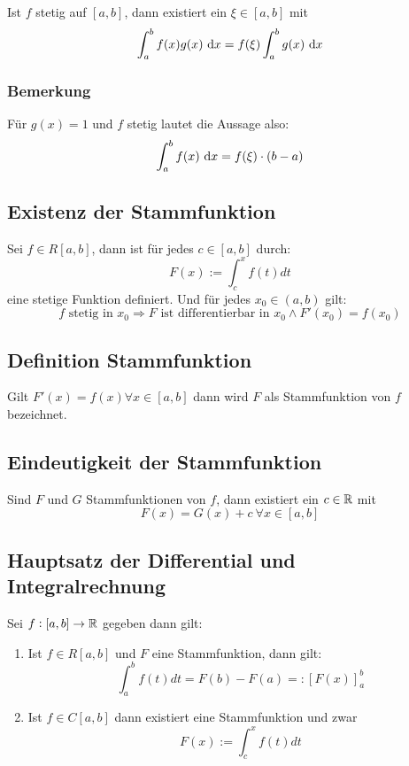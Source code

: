 Ist $f$ stetig auf $[a, b]$, dann existiert ein $\xi \in [a, b]$ mit
\begin{equation*}
    \int_a^b f(x)g(x)\text{ d}x = f(\xi) \int_a^b g(x) \text{ d}x
\end{equation*}

\subsubsection{Bemerkung}
Für $g(x)=1$ und $f$ stetig lautet die Aussage also:
\begin{equation*}
    \int_a^b f(x) \text{ d}x = f(\xi) \cdot (b - a)
\end{equation*}

\subsection{Existenz der Stammfunktion}
Sei $f \in R[a, b]$, dann ist für jedes $c \in [a, b]$ durch:
\begin{equation*}
    F(x) := \int_c^x f(t) dt
\end{equation*}
eine stetige Funktion definiert. Und für jedes $x_0 \in (a,b)$ gilt:
\begin{equation*}
    f \text{ stetig in } x_0 \Rightarrow F \text{ ist differentierbar in } x_0
    \land F'(x_0)=f(x_0)
\end{equation*}

\subsection{Definition Stammfunktion}
Gilt $F'(x) = f(x) \forall x \in [a,b]$ dann wird $F$ als Stammfunktion von
$f$ bezeichnet.

\subsection{Eindeutigkeit der Stammfunktion}
Sind $F$ und $G$ Stammfunktionen von $f$, dann existiert ein $c \in \mathbb{R}$ mit
\begin{equation*}
    F(x) = G(x) + c\ \forall x \in [a, b]
\end{equation*}

\subsection{Hauptsatz der Differential und Integralrechnung}
Sei $f: [a,b] \rightarrow \mathbb{R}$ gegeben dann gilt:
\begin{enumerate}[label= (\alph*)]
    \item Ist $f \in R[a,b]$ und $F$ eine Stammfunktion, dann gilt:
        \begin{equation*}
            \int_a^b f(t) dt = F(b) - F(a) =: {\left[ F(x) \right]}_a^b
        \end{equation*}
    \item Ist $f \in C[a, b]$ dann existiert eine Stammfunktion und zwar
        \begin{equation*}
            F(x) := \int_c^x f(t) dt
        \end{equation*}
\end{enumerate}

